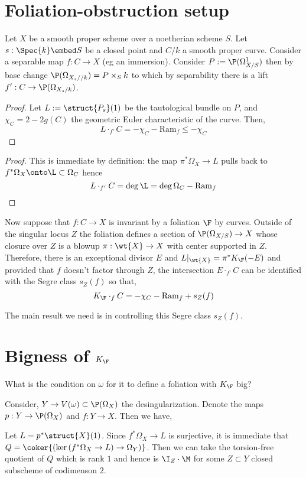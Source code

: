 \documentclass[12pt]{article}
\begin{document}
\section{Foliation-obstruction setup}

\newcommand{\Ram}{\mathrm{Ram}}

Let $X$ be a smooth proper scheme over a noetherian scheme $S$. Let $s : \Spec{k} \embed S$ be a closed point and $C / k$ a smooth proper curve. Consider a separable map $f : C \to X$ (eg an immersion). Consider $P := \P(\Omega_{X/S}^1)$ then by base change $\P(\Omega_{X_s//k}) = P \times_S k$ to which by separability there is a lift $f' : C \to \P(\Omega_{X_s/k})$.

\begin{proof}
Let $L := \struct{P_s}(1)$ be the tautological bundle on $P$, and $\chi_C = 2 - 2 g(C)$ the geometric Euler characteristic of the curve. Then,
\[ L \cdot_{f'} C = - \chi_C - \Ram_f \le - \chi_C \]
\end{proof}

\begin{proof}
This is immediate by definition: the map $\pi^* \Omega_X \to L$ pulls back to $f^* \Omega_X \onto \L \subset \Omega_C$ hence 
\[ L \cdot_{f'} C = \deg{\L} = \deg{\Omega_C} - \Ram_f \] 
\end{proof}

Now suppose that $f : C \to X$ is invariant by a foliation $\F$ by curves. Outside of the singular locus $Z$ the foliation defines a section of $\P(\Omega_{X/S}) \to X$ whose closure over $Z$ is a blowup  $\pi : \wt{X} \to X$ with center supported in $Z$. Therefore, there is an exceptional divisor $E$ and $L|_{\wt{X}} = \pi^* K_{\F}(-E)$ and provided that $f$ doesn't factor through $Z$, the intersection $E \cdot_{f'} C$ can be identified with the Segre class $s_Z(f)$ so that,
\[ K_{\F} \cdot_{f} C = - \chi_C - \Ram_f + s_Z(f) \]

The main result we need is in controlling this Segre class $s_Z(f)$.


\section{Bigness of $K_\F$}

What is the condition on $\omega$ for it to define a foliation with $K_\F$ big?

Consider, $Y \to V(\omega) \subset \P(\Omega_X)$ the desingularization. Denote the maps $p : Y \to \P(\Omega_X)$ and $f : Y \to X$. Then we have,
\begin{center}
\end{center}
Let $L = p^* \struct{X}(1)$.
Since $f^* \Omega_X \to L$ is surjective, it is immediate that $Q = \coker{(\ker{(f^* \Omega_X \to L)} \to \Omega_Y)}$.
Then we can take the torsion-free quotient of $Q$ which is rank $1$ and hence is $\I_Z \cdot \M$ for some $Z \subset Y$ closed subscheme of codimenson $2$. 
\end{document}
